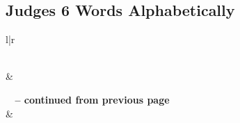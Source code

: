 

\subsection{Judges 6 Words Alphabetically}


\normalsize
 
\begin{center}
\begin{longtable}{l|r}
\caption[Judges 6 Words Alphabetically]{Judges 6 Words Alphabetically}\label{table:WordsAlphabetically for Judges 6} \\
\hline {} &  \\ \hline 
\endfirsthead
 
{{\bfseries \tablename\ \thetable{} -- continued from previous page}} \\  
\hline {} &  \\ \hline 
\endhead
 

\end{longtable}
\end{center}
